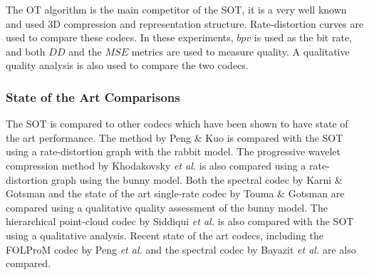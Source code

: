 The OT algorithm is the main competitor of the SOT, it is a very well known and used 3D compression and representation structure. Rate-distortion curves are used to compare these codecs. In these experiments, $bpv$ is used as the bit rate, and both $DD$ and the $MSE$ metrics are used to measure quality. A qualitative quality analysis is also used to compare the two codecs. 

\subsubsection{State of the Art Comparisons}

The SOT is compared to other codecs which have been shown to have state of the art performance. The method by Peng \& Kuo \cite{Peng05Geometry-Guided} is compared with the SOT using a rate-distortion graph with the rabbit model. The progressive wavelet compression method by Khodakovsky \textit{et al.} \cite{Khodakovsky00Progressive} is also compared using a rate-distortion graph using the bunny model. Both the spectral codec by Karni \& Gotsman \cite{Karni00Spectral} and the state of the art single-rate codec by Touma \& Gotsman \cite{touma98triangle} are compared using a qualitative quality assessment of the bunny model. The hierarchical point-cloud codec by Siddiqui \textit{et al.} \cite{Siddiqui07Octree} is also compared with the SOT using a qualitative analysis. Recent state of the art codecs, including the FOLProM codec by Peng \textit{et al.} \cite{Peng10Feature} and the spectral codec by Bayazit \textit{et al.} \cite{Bayazit103DMesh} are also compared.
